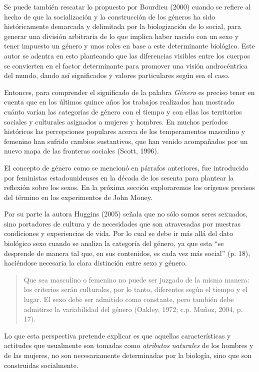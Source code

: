 Se puede también rescatar lo propuesto por Bourdieu (2000) cuando se refiere
al hecho de que la socialización y la construcción de los géneros ha sido
históricamente demarcada y delimitada por la biologización de lo social, para
generar una división arbitraria de lo que implica haber nacido con un sexo y
tener impuesto un género y unos roles en base a este determinante biológico.
Este autor se adentra en esto planteando que las diferencias visibles entre los
cuerpos se convierten en el factor determinante para promover una visión
androcéntrica del mundo, dando así significados y valores particulares según sea
el caso.

Entonces, para comprender el significado de la palabra \emph{Género} es
preciso tener en cuenta que en los últimos quince años los trabajos
realizados han mostrado cuánto varían las categorías de género con el tiempo y
con ellas los territorios sociales y culturales asignados a mujeres y hombres.
En muchos períodos históricos las percepciones populares acerca de los
temperamentos masculino y femenino han sufrido cambios sustantivos, que han
venido acompañados por un nuevo mapa de las fronteras sociales (Scott, 1996).

El concepto de género como se mencionó en párrafos anteriores, fue introducido
por feministas estadounidenses en la década de los sesenta para plantear la
reflexión sobre los sexos.
En la próxima sección exploraremos los orígenes precisos del término en los
experimentos de John Money.

Por su parte la autora Huggins (2005) señala que no sólo somos seres sexuados,
sino portadores de cultura y de necesidades que son atravesadas por nuestras
condiciones y experiencias de vida.
Por lo cual se debe ir más allá del dato biológico sexo cuando se analiza la
categoría del género, ya que esta “se desprende de manera tal que, en sus
contenidos, es cada vez más social” (p. 18), haciéndose necesaria la clara
distinción entre sexo y género.

\begin{quote}
    Que sea masculino o femenino no puede ser juzgado de la misma manera: los
    criterios serán culturales, por lo tanto, diferentes según el tiempo y el
    lugar.
    El sexo debe ser admitido como constante, pero también debe admitirse la
    variabilidad del género (Oakley, 1972; c.p. Muñoz, 2004, p. 17).
\end{quote}

Lo que esta perspectiva pretende explicar es que aquellas características y
actitudes que usualmente son tomadas como \emph{atributos naturales} de los
hombres y de las mujeres, no son necesariamente determinadas por la biología,
sino que son construidas socialmente.

